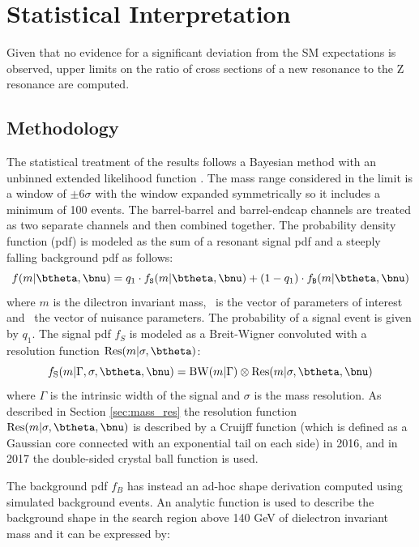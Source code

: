 \clearpage
\section{Statistical Interpretation}
\label{sec:Zprime_Limit}
Given that no evidence for a significant deviation from the SM expectations is observed, upper limits on the ratio of cross sections of a new resonance to the Z resonance are computed.

\subsection*{Methodology}
The statistical treatment of the results follows a Bayesian method with an unbinned extended likelihood function \cite{CMS-AN-16-307,StatsPaper,StatsWorkshop}. The mass range considered in the limit is a window of $\pm6\sigma$ with the window expanded symmetrically so it includes a minimum of 100 events. The barrel-barrel and barrel-endcap channels are treated as two separate channels and then combined together.
The probability density function (pdf) is modeled as the sum of a resonant signal pdf and a steeply falling background pdf as follows:
\begin{equation}
\label{eq:model_pdf}
f(m|\btheta,\bnu) = q_1 \cdot  f_\mathtt{S}(m|\btheta,\bnu)  + (1-q_1) \cdot  f_\mathtt{B}(m|\btheta,\bnu)
\end{equation}
where $m$ is the dilectron invariant mass, \btheta\ is the vector of parameters of interest and \bnu\ the vector of nuisance parameters. The probability of a signal event is given by $q_1$.
The signal pdf $f_{S}$ is modeled as a Breit-Wigner convoluted with a resolution function $\mathrm{Res}(m | \sigma ,\btheta)$:
\begin{equation} \label{eq:sigpdf}
f_{\mathrm{S}} (m | \Gamma, \sigma, \btheta, \bnu) = \mathrm{BW}(m | \Gamma) \otimes \mathrm{Res} (m | \sigma ,\btheta, \bnu)
\end{equation}
where $\Gamma$ is the intrinsic width of the signal and $\sigma$ is the mass resolution.
As described in Section \ref{sec:mass_res} the resolution function $\mathrm{Res}(m | \sigma ,\btheta, \bnu)$ is described by a Cruijff function (which is defined as a Gaussian core connected with an exponential tail on each side) in 2016, and in 2017 the double-sided crystal ball function is used.

The background pdf $f_{B}$ has instead an ad-hoc shape derivation computed using simulated background events. An analytic function is used to describe the background shape in the search region above 140 GeV of dielectron invariant mass and it can be expressed by:

